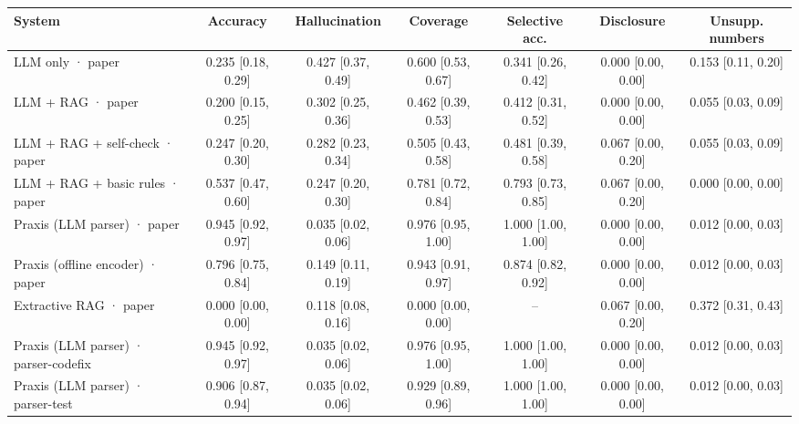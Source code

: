 \begin{tabular}{lcccccc}
\toprule
System & Accuracy & Hallucination & Coverage & Selective acc. & Disclosure & Unsupp. numbers \\
\midrule
LLM only · paper & 0.235 \scriptsize[0.18, 0.29] & 0.427 \scriptsize[0.37, 0.49] & 0.600 \scriptsize[0.53, 0.67] & 0.341 \scriptsize[0.26, 0.42] & 0.000 \scriptsize[0.00, 0.00] & 0.153 \scriptsize[0.11, 0.20] \\
LLM + RAG · paper & 0.200 \scriptsize[0.15, 0.25] & 0.302 \scriptsize[0.25, 0.36] & 0.462 \scriptsize[0.39, 0.53] & 0.412 \scriptsize[0.31, 0.52] & 0.000 \scriptsize[0.00, 0.00] & 0.055 \scriptsize[0.03, 0.09] \\
LLM + RAG + self-check · paper & 0.247 \scriptsize[0.20, 0.30] & 0.282 \scriptsize[0.23, 0.34] & 0.505 \scriptsize[0.43, 0.58] & 0.481 \scriptsize[0.39, 0.58] & 0.067 \scriptsize[0.00, 0.20] & 0.055 \scriptsize[0.03, 0.09] \\
LLM + RAG + basic rules · paper & 0.537 \scriptsize[0.47, 0.60] & 0.247 \scriptsize[0.20, 0.30] & 0.781 \scriptsize[0.72, 0.84] & 0.793 \scriptsize[0.73, 0.85] & 0.067 \scriptsize[0.00, 0.20] & 0.000 \scriptsize[0.00, 0.00] \\
Praxis (LLM parser) · paper & 0.945 \scriptsize[0.92, 0.97] & 0.035 \scriptsize[0.02, 0.06] & 0.976 \scriptsize[0.95, 1.00] & 1.000 \scriptsize[1.00, 1.00] & 0.000 \scriptsize[0.00, 0.00] & 0.012 \scriptsize[0.00, 0.03] \\
Praxis (offline encoder) · paper & 0.796 \scriptsize[0.75, 0.84] & 0.149 \scriptsize[0.11, 0.19] & 0.943 \scriptsize[0.91, 0.97] & 0.874 \scriptsize[0.82, 0.92] & 0.000 \scriptsize[0.00, 0.00] & 0.012 \scriptsize[0.00, 0.03] \\
Extractive RAG · paper & 0.000 \scriptsize[0.00, 0.00] & 0.118 \scriptsize[0.08, 0.16] & 0.000 \scriptsize[0.00, 0.00] & -- & 0.067 \scriptsize[0.00, 0.20] & 0.372 \scriptsize[0.31, 0.43] \\
Praxis (LLM parser) · parser-codefix & 0.945 \scriptsize[0.92, 0.97] & 0.035 \scriptsize[0.02, 0.06] & 0.976 \scriptsize[0.95, 1.00] & 1.000 \scriptsize[1.00, 1.00] & 0.000 \scriptsize[0.00, 0.00] & 0.012 \scriptsize[0.00, 0.03] \\
Praxis (LLM parser) · parser-test & 0.906 \scriptsize[0.87, 0.94] & 0.035 \scriptsize[0.02, 0.06] & 0.929 \scriptsize[0.89, 0.96] & 1.000 \scriptsize[1.00, 1.00] & 0.000 \scriptsize[0.00, 0.00] & 0.012 \scriptsize[0.00, 0.03] \\
\bottomrule
\end{tabular}
